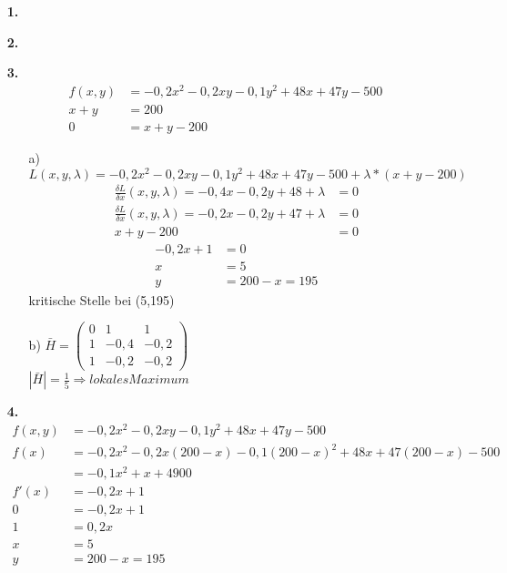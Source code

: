 \documentclass[a4paper,11pt,fleqn]{scrartcl}
\author{\authorinfo}
\title{\titleinfo}
\date{\today}
\begin{document}
\maketitle
\begin{enumerate}
    
\item[\textbf{1.}]


\item[\textbf{2.}]


\item[\textbf{3.}]
    \begin{align*}
    	f(x,y)&=-0,2x^2-0,2xy-0,1y^2+48x+47y-500 \\
    	x+y&=200 \\
    	0&=x+y-200
    \end{align*}
    \begin{itemize}
    	\item[a)]
			$L(x,y,\lambda )=-0,2x^2-0,2xy-0,1y^2+48x+47y-500+ \lambda *\left( x+y-200 \right) $\\
			\begin{align*}
				\frac{\delta L}{\delta x}(x,y,\lambda)=-0,4x-0,2y+48+\lambda&=0\\
				\frac{\delta L}{\delta x}(x,y,\lambda)=-0,2x-0,2y+47+\lambda&=0\\
				x+y-200&=0
			\end{align*}
			\begin{align*}
				-0,2x+1&=0\\
				x&=5\\
				y&=200-x=195
			\end{align*}
			kritische Stelle bei (5,195)
		\item[b)]
			$\bar{H}=\left(\begin{matrix}
				0 & 1 & 1 \\
				1 & -0,4 & -0,2 \\
				1 & -0,2 & -0,2 
			\end{matrix}\right)$\\
			$|\bar{H}|=\frac{1}{5} \Rightarrow lokales Maximum $
    \end{itemize}

\item[\textbf{4.}]
	\begin{align*}
		f(x,y)&=-0,2x^2-0,2xy-0,1y^2+48x+47y-500 \\
		f(x)&=-0,2x^2-0,2x\left(200-x\right)-0,1\left(200-x\right)^2+48x+47\left(200-x\right)-500 \\
		&=-0,1x^2+x+4900 \\
		f'(x)&=-0,2x+1 \\
		0&=-0,2x+1\\
		1&=0,2x\\
		x&=5\\
		y&=200-x=195\\
	\end{align*}
\end{enumerate}
\end{document}
